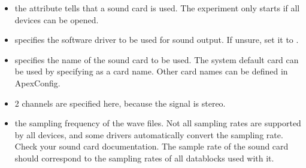 \begin{itemize}
\item {} the 
attribute tells \apex that a sound card is used. The experiment
only starts if all devices can be opened.

\item {} specifies the software driver to be used
for sound output. If unsure, set it to .

\item {} specifies the name of the sound card to be
used. The system default card can be used by specifying
 as a card name. Other card names can be defined in
ApexConfig.

\item {} 2 channels are specified here, because
the signal is stereo.

\item {} the sampling frequency of the wave
files. Not all sampling rates are supported by all devices, and
some drivers automatically convert the sampling rate. Check your
sound card documentation. The sample rate of the sound card should
correspond to the sampling rates of all datablocks used with it.

\end{itemize}








